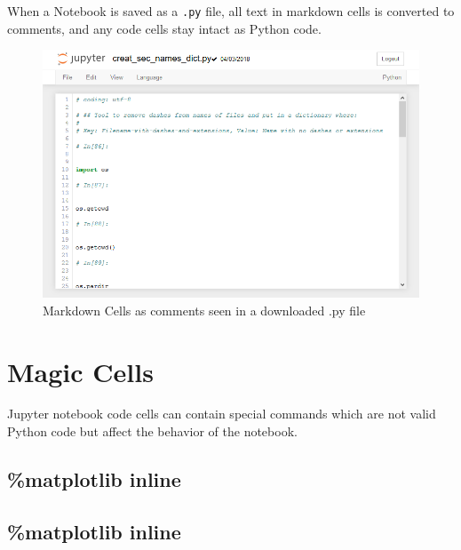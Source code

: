 \documentclass{book}
\makeatletter
\def\maxwidth{\ifdim\Gin@nat@width>\linewidth\linewidth
    \else\Gin@nat@width\fi}
\let\Oldincludegraphics\includegraphics
\renewcommand{\includegraphics}[1]{\Oldincludegraphics[width=.8\maxwidth]{#1}}
\makeatother
\begin{document}
When a Notebook is saved as a \lstinline!.py! file, all text in markdown
cells is converted to comments, and any code cells stay intact as Python
code.

\begin{figure}
\centering
\includegraphics{images/jupyter_notebook_markdown_cells_as_comments.png}
\caption{Markdown Cells as comments seen in a downloaded .py file}
\end{figure}
    




    
        \section{Magic Cells}\label{magic-cells}
    




    
        Jupyter notebook code cells can contain special commands which are not
valid Python code but affect the behavior of the notebook.
    




    
        \subsection{\%matplotlib inline}\label{matplotlib-inline}
    




    
        \subsection{\%matplotlib inline}\label{matplotlib-inline}
\end{document}
